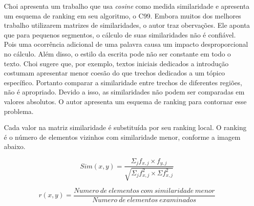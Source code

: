 Choi \cite{Choi2000} apresenta um trabalho que usa \textit{cosine} como medida similaridade e apresenta um esquema de ranking em seu algoritmo, o C99.
%
Embora muitos dos melhores trabalho utilizarem matrizes de similaridades, o autor traz obervações.
%
Ele aponta que para pequenos segmentos, o cálculo de suas similaridades não é confiável. Pois uma ocorrência adicional de uma palavra causa um impacto desproporcional no cálculo.
%
Além disso, o estilo da escrita pode não ser constante em todo o texto. Choi sugere que, por exemplo, textos iniciais dedicados a introdução costumam apresentar menor coesão do que trechos dedicados a um tópico específico. Portanto comparar a similaridade entre trechos de diferentes regiões, não é apropriado.
Devido a isso, as similaridades não podem ser comparadas em valores absolutos. O autor apresenta um esquema de ranking para contornar esse problema.

Cada valor na matriz similaridade é substituída por seu ranking local. O ranking é o número de elementos vizinhos com similaridade menor, conforme a imagem abaixo.


\begin{equation}
Sim(x,y) = \frac
{\Sigma_j f_{x,j} \times f_{y,j}}
{\sqrt{\Sigma_j f^2_{x,j} \times \Sigma f^2_{x,j}}}
\end{equation}



\begin{equation}
r(x,y) = \frac
{Numero\ de\ elementos\ com\ similaridade\ menor}
{Numero\ de\ elementos\ examinados}
\end{equation}












